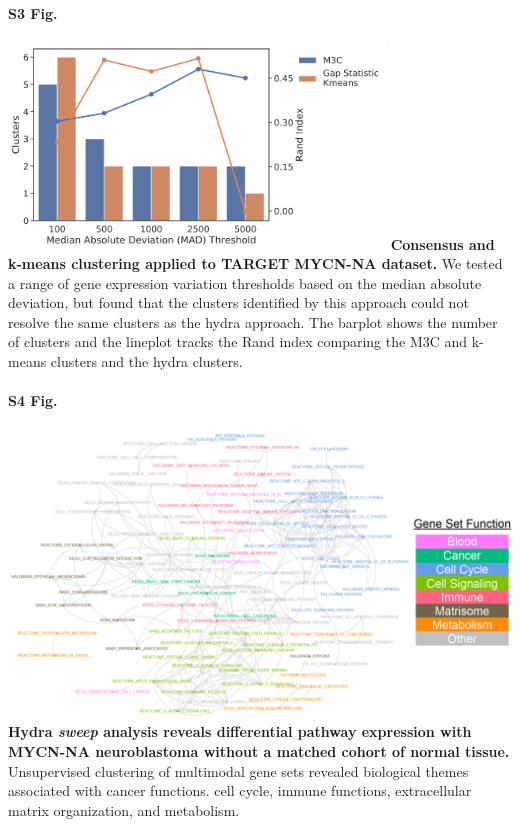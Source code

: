 \documentclass[10pt,letterpaper]{article}
\begin{document}
\paragraph*{S3 Fig.}
\includegraphics[width=0.75\textwidth]{img/PNG/clustering-screen}
\label{S3_Fig}
{\bf{Consensus and k-means clustering applied to TARGET MYCN-NA dataset.}} We tested a range of gene expression variation thresholds based on the median absolute deviation, but found that the clusters identified by this approach could not resolve the same clusters as the hydra approach. The barplot shows the number of clusters and the lineplot tracks the Rand index comparing the M3C and k-means clusters and the hydra clusters.

\paragraph*{S4 Fig.}
\includegraphics[width=\textwidth]{img/PNG/sweep-gene-set-network-V4-2x}
\label{S4_Fig}{\bf Hydra \textit{sweep} analysis reveals differential pathway expression with MYCN-NA neuroblastoma without a matched cohort of normal tissue.} 
Unsupervised clustering of multimodal gene sets revealed biological themes associated with cancer functions. cell cycle, immune functions, extracellular matrix organization, and metabolism.
\end{document}
